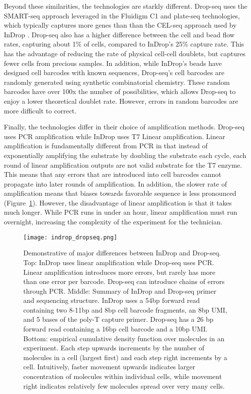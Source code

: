 Beyond these similarities, the technologies are starkly different. 
Drop-seq uses the SMART-seq approach leveraged in the Fluidigm C1 and plate-seq technologies, which typically captures more genes than than the CEL-seq approach used by InDrop \citep{Ziegenhain2017}. 
Drop-seq also has a higher difference between the cell and bead flow rates, capturing about 1\% of cells, compared to InDrop’s 25\% capture rate. 
This has the advantage of reducing the rate of physical cell-cell doublets, but captures fewer cells from precious samples. 
In addition, while InDrop’s beads have designed cell barcodes with known sequences, Drop-seq’s cell barcodes are randomly generated using synthetic combinatorial chemistry. 
These random barcodes have over 100x the number of possibilities, which allows Drop-seq to enjoy a lower theoretical doublet rate. 
However, errors in random barcodes are more difficult to correct. 

Finally, the technologies differ in their choice of amplification methods. 
Drop-seq uses PCR amplification while InDrop uses T7 Linear amplification. 
Linear amplification is fundamentally different from PCR in that instead of exponentially amplifying the substrate by doubling the substrate each cycle, each round of linear amplification outputs are not valid substrate for the T7 enzyme. 
This means that any errors that are introduced into cell barcodes cannot propagate into later rounds of amplification. 
In addition, the slower rate of amplification means that biases towards favorable sequence is less pronounced (Figure~\ref{fig:indrop-dropseq}). 
However, the disadvantage of linear amplification is that it takes much longer. 
While PCR runs in under an hour, linear amplification must run overnight, increasing the complexity of the experiment for the technician. 

\begin{figure}
\centering
\texttt{[image: indrop\_dropseq.png]}
  \caption{Demonstrative of major differences between InDrop and Drop-seq. Top: InDrop uses linear amplification while Drop-seq uses PCR\@. Linear amplification introduces more errors, but rarely has more than one error per barcode. Drop-seq can introduce chains of errors through PCR\@. Middle: Summary of InDrop and Drop-seq primer and sequencing structure. InDrop uses a 54bp forward read containing two 8-11bp and 8bp cell barcode fragments, an 8bp UMI, and 5 bases of the poly-T capture primer. Drop-seq has a 26 bp forward read containing a 16bp cell barcode and a 10bp UMI\@. Bottom: empirical cumulative density function over molecules in an experiment. Each step upwards increments by the number of molecules in a cell (largest first) and each step right increments by a cell. Intuitively, faster movement upwards indicates larger concentration of molecules within individual cells, while movement right indicates relatively few molecules spread over very many cells.}
\label{fig:indrop-dropseq}
\end{figure} 

